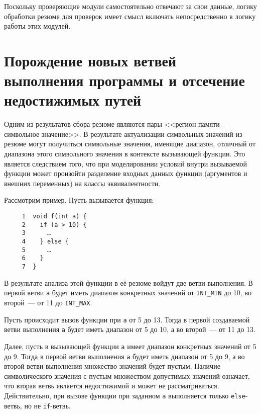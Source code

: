 Поскольку проверяющие модули самостоятельно отвечают за свои данные, логику обработки резюме для проверок имеет смысл включать непосредственно в логику работы этих модулей.

\section{Порождение новых ветвей выполнения программы и отсечение недостижимых путей}

Одним из результатов сбора резюме являются пары <<регион памяти~--- символьное значение>>. В результате актуализации символьных значений из резюме могут получиться символьные значения, имеющие диапазон, отличный от диапазона этого символьного значения в контексте вызывающей функции. Это является следствием того, что при моделировании условий внутри вызываемой функции может произойти разделение входных данных функции (аргументов и внешних переменных) на классы эквивалентности.

Рассмотрим пример. Пусть вызывается функция:

\begin{verbatim}
     1  void f(int a) {
     2    if (a > 10) {
     3      …
     4    } else {
     5      …
     6    }
     7  }
\end{verbatim}

В результате анализа этой функции в её резюме войдут две ветви выполнения. В первой ветви \texttt{a} будет иметь диапазон конкретных значений от \texttt{INT\_MIN} до 10, во второй~--- от 11 до \texttt{INT\_MAX}.

Пусть происходит вызов функции при \texttt{a} от 5 до 13. Тогда в первой создаваемой ветви выполнения \texttt{а} будет иметь диапазон от 5 до 10, а во второй~--- от 11 до 13.

Далее, пусть в вызывающей функции \texttt{a} имеет диапазон конкретных значений от 5 до 9. Тогда в первой ветви выполнения \texttt{a} будет иметь диапазон от 5 до 9, а во второй ветви выполнения множество значений будет пустым. Наличие символического значения с пустым множеством допустимых значений означает, что вторая ветвь является недостижимой и может не рассматриваться. Действительно, при вызове функции при заданном \texttt{а} выполняется только \texttt{else}-ветвь, но не \texttt{if}-ветвь.

